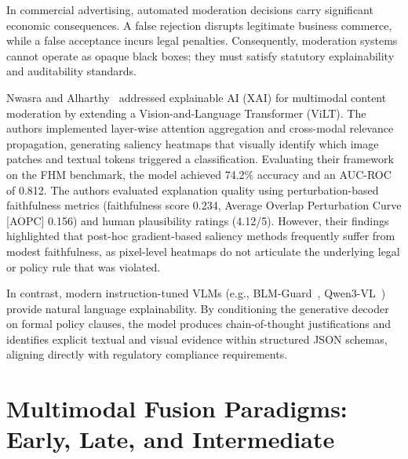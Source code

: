 \documentclass[12pt,a4paper]{report}
\begin{document}
In commercial advertising, automated moderation decisions carry significant economic consequences. A false rejection disrupts legitimate business commerce, while a false acceptance incurs legal penalties. Consequently, moderation systems cannot operate as opaque black boxes; they must satisfy statutory explainability and auditability standards.

Nwasra and Alharthy~\cite{nwasra2026} addressed explainable AI (XAI) for multimodal content moderation by extending a Vision-and-Language Transformer (ViLT). The authors implemented layer-wise attention aggregation and cross-modal relevance propagation, generating saliency heatmaps that visually identify which image patches and textual tokens triggered a classification. Evaluating their framework on the FHM benchmark, the model achieved 74.2\% accuracy and an AUC-ROC of 0.812. The authors evaluated explanation quality using perturbation-based faithfulness metrics (faithfulness score 0.234, Average Overlap Perturbation Curve [AOPC] 0.156) and human plausibility ratings (4.12/5). However, their findings highlighted that post-hoc gradient-based saliency methods frequently suffer from modest faithfulness, as pixel-level heatmaps do not articulate the underlying legal or policy rule that was violated.

In contrast, modern instruction-tuned VLMs (e.g., BLM-Guard~\cite{blmguard2026}, Qwen3-VL~\cite{bai2023qwen}) provide natural language explainability. By conditioning the generative decoder on formal policy clauses, the model produces chain-of-thought justifications and identifies explicit textual and visual evidence within structured JSON schemas, aligning directly with regulatory compliance requirements.

\section{Multimodal Fusion Paradigms: Early, Late, and Intermediate}
\end{document}
